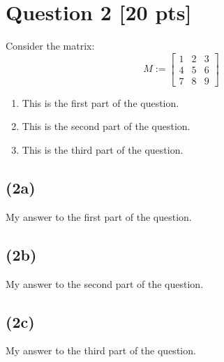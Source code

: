 \section*{Question 2 [20 pts]}

Consider the matrix:
$$M := \begin{bmatrix}
1 & 2 & 3 \\
4 & 5 & 6 \\
7 & 8 & 9
\end{bmatrix}$$

\begin{enumerate}[label=(\alph*)]
\item This is the first part of the question.
\item This is the second part of the question.
\item This is the third part of the question.
\end{enumerate}

\solidrule

\subsection*{(2a)}

My answer to the first part of the question.

\dotrule

\subsection*{(2b)}

My answer to the second part of the question.

\dotrule

\subsection*{(2c)}

My answer to the third part of the question.


\solidrule